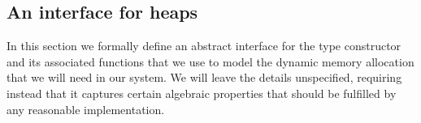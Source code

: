 \documentclass{article}
\theoremstyle{definition}
\newcommand{\Conid}[1]{\mathit{#1}}
\newcommand{\Varid}[1]{\mathit{#1}}
\def\resethooks{\global\let\SaveRestoreHook\empty
  \global\let\ColumnHook\empty}
\newlength{\blanklineskip}
\let\hspost\empty
\renewcommand\Varid[1]{\mathord{\textsf{#1}}}
\let\Conid\Varid
\newcommand\Keyword[1]{\textsf{\textbf{#1}}}
\renewcommand\Keyword[1]{\textsf{\underline{#1}}}
\renewcommand\Varid[1]{\textsf{#1}}
\begin{document}
\subsection{An interface for heaps} \label{section:Heaps}
\begin{comment}
\begin{hscode}\SaveRestoreHook
\column{B}{@{}>{\hspre}l<{\hspost}@{}}\column{E}{@{}>{\hspre}l<{\hspost}@{}}\>[B]{}\Keyword{module}\;\Conid{Heap}\;\Keyword{where}{}\<[E]\\blanklineskip]\>[B]{}\Keyword{infix}\;\Varid{8}\;\Varid{\char95 ▸\char95 }{}\<[E]\\
\>[B]{}\Keyword{infix}\;\Varid{7}\;\Varid{\char95 ⊆\char95 }{}\<[E]\\
\>[B]{}\Keyword{infix}\;\Varid{10}\;\Varid{\char95 !\char95 }{}\<[E]\ColumnHook
\end{hscode}\resethooks
\end{comment}

In this section we formally define an abstract interface for the type
constructor {\textsmaller[.5]{\ensuremath{\Conid{Heap}}}} and its associated functions that we use to model
the dynamic memory allocation that we will need in our system.  We
will leave the details unspecified, requiring instead that it captures
certain algebraic properties that should be fulfilled by any
reasonable implementation.
\end{document}

